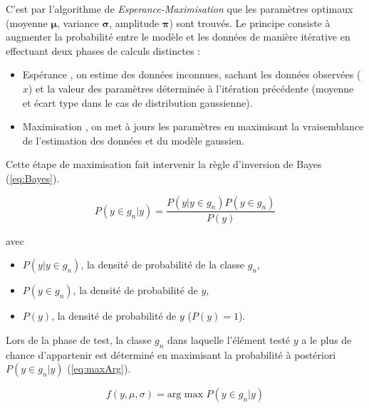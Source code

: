 

C'est par l'algorithme de \textit{Esperance-Maximisation} \cite{Dempster} que les paramètres optimaux (moyenne $\bm{\mu}$, variance $\bm{\sigma}$, amplitude $\bm{\pi}$) sont trouvés. Le principe consiste à augmenter la probabilité entre le modèle et les données de manière itérative en effectuant deux phases de calculs distinctes :
\begin{itemize}
\item \og Espérance \fg{}, on estime des données inconnues, sachant les données observées ($x$) et la valeur des paramètres déterminée à l'itération précédente (moyenne et écart type dans le cas de distribution gaussienne). 
\item \og Maximisation \fg, on met à jours les paramètres en maximisant la vraisemblance de l'estimation des données et du modèle gaussien.\\
\end{itemize}

Cette étape de maximisation fait intervenir la règle d'inversion de Bayes (\ref{eq:Bayes}).

\begin{equation}\label{eq:Bayes}
P(y \in g_n \vert y) = \frac{P(y \vert y \in g_n)P(y \in g_n)}{P(y)}
\end{equation}

avec 
\begin{itemize}
\item $P(y \vert y \in g_n)$, la densité de probabilité de la classe $g_n$, 
\item $P(y \in g_n)$, la densité de probabilité de $y$, 
\item $P(y)$, la densité de probabilité de $y$ ($P(y) = 1$).\\
\end{itemize}

Lors de la phase de test, la classe $g_n$ dans laquelle l'élément testé $y$ a le plus de chance d'appartenir est déterminé en maximisant la probabilité à postériori $P(y\in g_n\vert y)$ (\ref{eq:maxArg}).

\begin{equation}\label{eq:maxArg}
f(y,\mu, \sigma) = \text{arg max } P(y\in g_n\vert y)
\end{equation}

